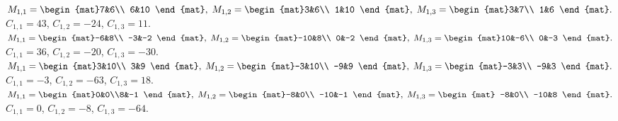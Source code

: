 \begin{Answer}
\Question $M_{1,1}=\begin{mat}7&6\\  6&10 \end{mat},\; M_{1,2}=\begin{mat}3&6\\  1&10 \end{mat},\; M_{1,3}=\begin{mat}3&7\\  1&6 \end{mat}.$\\
$C_{1,1}= 43$, $C_{1,2}= -24$, $C_{1,3}= 11$.
\Question $M_{1,1}=\begin{mat}-6&8\\  -3&-2 \end{mat},\; M_{1,2}=\begin{mat}-10&8\\  0&-2 \end{mat},\; M_{1,3}=\begin{mat}10&-6\\  0&-3 \end{mat}.$\\
$C_{1,1}= 36$, $C_{1,2}= -20$, $C_{1,3}= -30$.
\Question $M_{1,1}=\begin{mat}3&10\\  3&9 \end{mat},\; M_{1,2}=\begin{mat}-3&10\\  -9&9 \end{mat},\; M_{1,3}=\begin{mat}-3&3\\  -9&3 \end{mat}.$\\
$C_{1,1}= -3$, $C_{1,2}= -63$, $C_{1,3}= 18$.
\Question $M_{1,1}=\begin{mat}0&0\\8&-1 \end{mat},\; M_{1,2}=\begin{mat}-8&0\\  -10&-1 \end{mat},\; M_{1,3}=\begin{mat} -8&0\\  -10&8 \end{mat}.$\\
$C_{1,1}=0 $, $C_{1,2}= -8$, $C_{1,3}= -64$.
\end{Answer}
